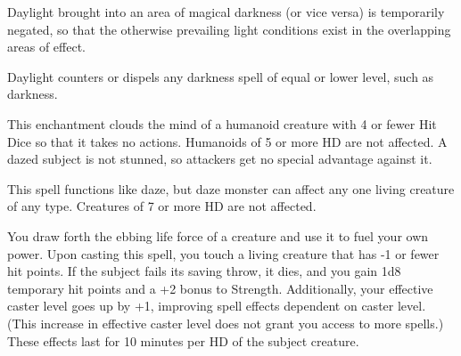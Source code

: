 \begin{multicols}{2}
\begin{small}
\smallskip\noindent Daylight brought into an area of magical darkness (or vice versa) is temporarily negated, so that the otherwise prevailing light conditions exist in the overlapping areas of effect.

\smallskip\noindent Daylight counters or dispels any darkness spell of equal or lower level, such as darkness.

\noindent This enchantment clouds the mind of a humanoid creature with 4 or fewer Hit Dice so that it takes no actions. Humanoids of 5 or more HD are not affected. A dazed subject is not stunned, so attackers get no special advantage against it.


\noindent This spell functions like daze, but daze monster can affect any one living creature of any type. Creatures of 7 or more HD are not affected.

\noindent You draw forth the ebbing life force of a creature and use it to fuel your own power. Upon casting this spell, you touch a living creature that has -1 or fewer hit points. If the subject fails its saving throw, it dies, and you gain 1d8 temporary hit points and a +2 bonus to Strength. Additionally, your effective caster level goes up by +1, improving spell effects dependent on caster level. (This increase in effective caster level does not grant you access to more spells.) These effects last for 10 minutes per HD of the subject creature.


\end{small}
\end{multicols}
